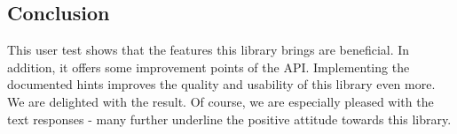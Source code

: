 \subsection{Conclusion} %
\label{sub:Conclusion}

This user test shows that the features this library brings are beneficial. In
addition, it offers some improvement points of the API. Implementing the
documented hints improves the quality and usability of this library even more.
We are delighted with the result. Of course, we are especially pleased with the
text responses - many further underline the positive attitude towards this
library. 

